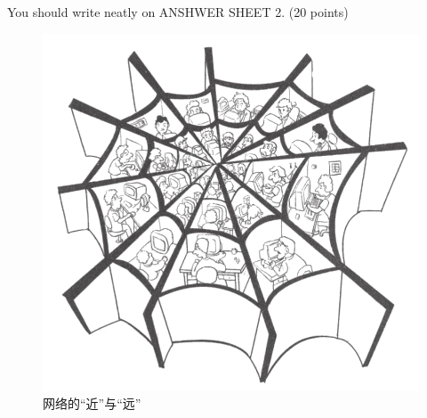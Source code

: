 You should write neatly on ANSHWER SHEET 2. (20 points)


\begin{figure}[h!]
	\centering
	\includegraphics[width=0.32\linewidth]{picture/2009.png}
	\caption*{网络的“近”与“远”}
\end{figure}


